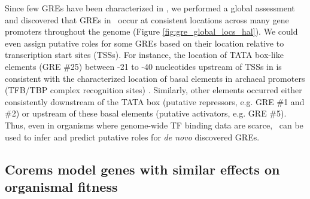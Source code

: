 Since few GREs have been characterized in \halo, we performed a global assessment and discovered that GREs in \egrine~occur at consistent locations across many gene promoters throughout the genome (Figure \ref{fig:gre_global_locs_hal}). We could even assign putative roles for some GREs based on their location relative to transcription start sites (TSSs). For instance, the location of TATA box-like elements (GRE \#25) between -21 to -40 nucleotides upstream of TSSs in \halo is consistent with the characterized location of basal elements in archaeal promoters (TFB/TBP complex recognition sites) \cite{geiduschek_archaeal_2005}. Similarly, other elements occurred either consistently downstream of the TATA box (putative repressors, e.g. GRE \#1 and \#2) or upstream of these basal elements (putative activators, e.g. GRE \#5). Thus, even in organisms where genome-wide TF binding data are scarce, \egrine~can be used to infer and predict putative roles for \textit{de novo} discovered GREs.

\subsection{Corems model genes with similar effects on organismal fitness}

